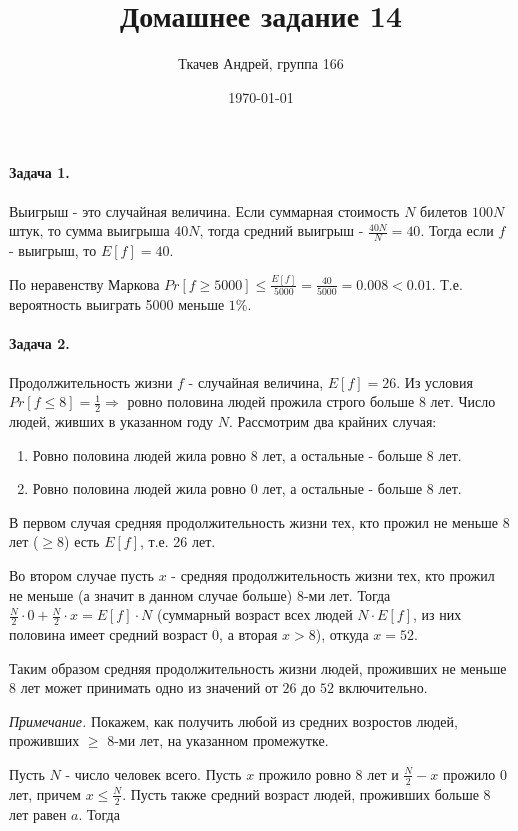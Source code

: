 \documentclass{article}
\title{Домашнее задание 14}
\author{Ткачев Андрей, группа 166}
\date{\today}
\newcommand{\half}[1]{\frac{#1}{2}}
\begin{document}
	\maketitle
	\paragraph{Задача 1.}

    Выигрыш - это случайная величина. Если суммарная стоимость $N$ билетов $100N$ штук, то сумма выигрыша $40N$, тогда средний выигрыш - $\frac{40N}{N} = 40$. Тогда если $f$ - выигрыш, то $E[f] = 40$.

    По неравенству Маркова $Pr[f \ge 5000] \le \frac{E[f]}{5000} = \frac{40}{5000} = 0.008 < 0.01 $. Т.е. вероятность выиграть 5000 меньше $1\%$.

    \paragraph{Задача 2.}
    Продолжительность жизни $f$ - случайная величина, $E[f] = 26$. Из условия $Pr[f \le 8] = \half{1} \Rightarrow$ ровно половина людей прожила строго больше 8 лет.
    Число людей, живших в указанном году $N$. Рассмотрим два крайних случая:

    \begin{enumerate}
        \item Ровно половина людей жила ровно 8 лет, а остальные - больше 8 лет.
        \item Ровно половина людей жила ровно 0 лет, а остальные - больше 8 лет.
    \end{enumerate}

    В первом случая средняя продолжительность жизни тех, кто прожил не меньше 8 лет ($\ge 8$) есть $E[f]$, т.е. 26 лет.

    Во втором случае пусть $x$ - средняя продолжительность жизни тех, кто прожил не меньше (а значит в данном случае больше) 8-ми лет. Тогда $\half{N} \cdot 0  + \half{N} \cdot x = E[f] \cdot N$ (суммарный возраст всех людей $N \cdot E[f]$, из них половина имеет средний возраст 0, а вторая $x > 8$), откуда $x = 52$.

    Таким образом средняя продолжительность жизни людей, проживших не меньше 8 лет может принимать одно из значений от $26$ до $52$ включительно.

    \textit{Примечание.}
    Покажем, как получить любой из средних возростов людей, проживших $\ge$ 8-ми лет, на указанном промежутке. 

    Пусть $N$ - число человек всего. Пусть $x$ прожило ровно 8 лет и $\half{N} - x$ прожило 0 лет, причем $x \le \half{N}$.
    Пусть также средний возраст людей, проживших больше 8 лет равен $a$. Тогда 
\end{document}
